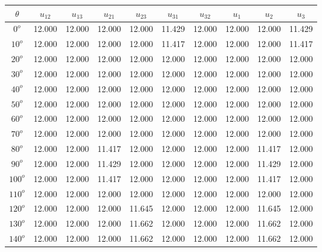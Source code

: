 	\singlespacing
	\begin{table}[H]
	    \centering
	    \begin{tabular}{|c|c|c|c|c|c|c|c|c|c|}
	    \hline
	    $\theta$ &  $u_{12}$ & $u_{13}$ & $u_{21}$ & $u_{23}$ & $u_{31}$ & $u_{32}$ & $u_{1}$ & $u_{2}$ & $u_{3}$ \\
	    \hline
	    $0^{o}$ & 12.000 & 12.000 & 12.000 & 12.000 & 11.429 & 12.000 & 12.000 & 12.000 & 11.429 \\
	    \hline
	    $10^{o}$ & 12.000 & 12.000 & 12.000 & 12.000 & 11.417 & 12.000 & 12.000 & 12.000 & 11.417 \\
	    \hline
	    $20^{o}$ & 12.000 & 12.000 & 12.000 & 12.000 & 12.000 & 12.000 & 12.000 & 12.000 & 12.000 \\
	    \hline
	    $30^{o}$ & 12.000 & 12.000 & 12.000 & 12.000 & 12.000 & 12.000 & 12.000 & 12.000 & 12.000 \\
	    \hline
	    $40^{o}$ & 12.000 & 12.000 & 12.000 & 12.000 & 12.000 & 12.000 & 12.000 & 12.000 & 12.000 \\
	    \hline
	    $50^{o}$ & 12.000 & 12.000 & 12.000 & 12.000 & 12.000 & 12.000 & 12.000 & 12.000 & 12.000 \\
	    \hline
	    $60^{o}$ & 12.000 & 12.000 & 12.000 & 12.000 & 12.000 & 12.000 & 12.000 & 12.000 & 12.000 \\
	    \hline
	    $70^{o}$ & 12.000 & 12.000 & 12.000 & 12.000 & 12.000 & 12.000 & 12.000 & 12.000 & 12.000 \\
	    \hline
	    $80^{o}$ & 12.000 & 12.000 & 11.417 & 12.000 & 12.000 & 12.000 & 12.000 & 11.417 & 12.000 \\
	    \hline
	    $90^{o}$ & 12.000 & 12.000 & 11.429 & 12.000 & 12.000 & 12.000 & 12.000 & 11.429 & 12.000 \\
	    \hline
	    $100^{o}$ & 12.000 & 12.000 & 11.417 & 12.000 & 12.000 & 12.000 & 12.000 & 11.417 & 12.000 \\
	   \hline
	    $110^{o}$ & 12.000 & 12.000 & 12.000 & 12.000 & 12.000 & 12.000 & 12.000 & 12.000 & 12.000 \\
	    \hline
	    $120^{o}$ & 12.000 & 12.000 & 12.000 & 11.645 & 12.000 & 12.000 & 12.000 & 11.645 & 12.000 \\
	    \hline
	    $130^{o}$ & 12.000 & 12.000 & 12.000 & 11.662 & 12.000 & 12.000 & 12.000 & 11.662 & 12.000 \\
	    \hline
	    $140^{o}$ & 12.000 & 12.000 & 12.000 & 11.662 & 12.000 & 12.000 & 12.000 & 11.662 & 12.000 \\
	    \hline

\end{tabular}
\end{table}
